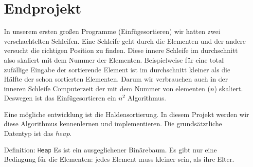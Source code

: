 \section{Endprojekt}


In unserem ersten großen Programme (Einfügesortieren) wir hatten
zwei verschachtelten Schleifen. Eine Schleife geht durch die Elementen
und der andere versucht die richtigen Position zu finden. Diese
innere Schleife im durchschnitt also skaliert mit dem Nummer der Elementen.
Beispielweise für eine total zufällige Eingabe der sortierende Element ist im 
durchschnitt kleiner als die Hälfte der schon sortierten Elementen. Darum 
wir verbrauchen  auch in der inneren Schleife Computerzeit der mit 
dem Nummer von elementen ($n$) skaliert. Deswegen ist das Einfügesortieren
ein $n^2$ Algorithmus.

Eine mögliche entwicklung ist die Haldensortierung. In diesem Projekt werden wir 
diese Algorithmus kennenlernen und implementieren. Die grundsätztliche Datentyp ist 
das $heap$.

\begin{myexampleblock}{Definition: \texttt{Heap}}
Es ist ein ausgeglichener Binärebaum. Es gibt nur eine Bedingung für die Elementen:
jedes Element muss kleiner sein, als ihre Elter.
\end{myexampleblock} 

